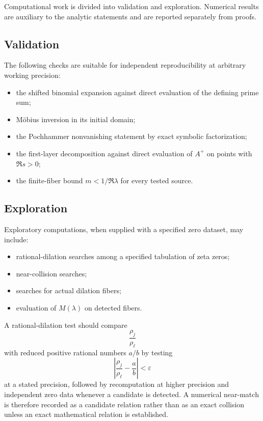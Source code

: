 \documentclass[11pt]{article}
\theoremstyle{definition}
\begin{document}
Computational work is divided into validation and exploration. Numerical results are auxiliary to the analytic statements and are reported separately from proofs.

\subsection{Validation}

The following checks are suitable for independent reproducibility at arbitrary working precision:
\begin{itemize}[nosep]
\item the shifted binomial expansion against direct evaluation of the defining prime sum;
\item Möbius inversion in its initial domain;
\item the Pochhammer nonvanishing statement by exact symbolic factorization;
\item the first-layer decomposition against direct evaluation of $A^+$ on points with $\Re s>0$;
\item the finite-fiber bound $m<1/\Re\lambda$ for every tested source.
\end{itemize}

\subsection{Exploration}

Exploratory computations, when supplied with a specified zero dataset, may include:
\begin{itemize}[nosep]
\item rational-dilation searches among a specified tabulation of zeta zeros;
\item near-collision searches;
\item searches for actual dilation fibers;
\item evaluation of $M(\lambda)$ on detected fibers.
\end{itemize}

A rational-dilation test should compare
\[
\frac{\rho_j}{\rho_\ell}
\]
with reduced positive rational numbers $a/b$ by testing
\[
\left|\frac{\rho_j}{\rho_\ell}-\frac ab\right|<\varepsilon
\]
at a stated precision, followed by recomputation at higher precision and independent zero data whenever a candidate is detected. A numerical near-match is therefore recorded as a candidate relation rather than as an exact collision unless an exact mathematical relation is established.
\end{document}

